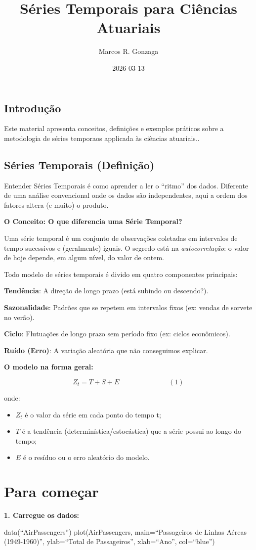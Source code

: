 \documentclass[
]{article}
\title{Séries Temporais para Ciências Atuariais}
\author{Marcos R. Gonzaga}
\date{2026-03-13}
\begin{document}
\maketitle

\subsection{Introdução}\label{introduuxe7uxe3o}

Este material apresenta conceitos, definições e exemplos práticos sobre
a metodologia de séries temporaos applicada às ciências atuariais..

\subsection{Séries Temporais
(Definição)}\label{suxe9ries-temporais-definiuxe7uxe3o}

Entender Séries Temporais é como aprender a ler o ``ritmo'' dos dados.
Diferente de uma análise convencional onde os dados são independentes,
aqui a ordem dos fatores altera (e muito) o produto.

\textbf{O Conceito: O que diferencia uma Série Temporal?}

Uma série temporal é um conjunto de observações coletadas em intervalos
de tempo sucessivos e (geralmente) iguais. O segredo está na
\emph{autocorrelação}: o valor de hoje depende, em algum nível, do valor
de ontem.

Todo modelo de séries temporais é divido em quatro componentes
principais:

\textbf{Tendência}: A direção de longo prazo (está subindo ou
descendo?).

\textbf{Sazonalidade}: Padrões que se repetem em intervalos fixos (ex:
vendas de sorvete no verão).

\textbf{Ciclo}: Flutuações de longo prazo sem período fixo (ex: ciclos
econômicos).

\textbf{Ruído (Erro)}: A variação aleatória que não conseguimos
explicar.

\textbf{O modelo na forma geral:}

\[Z_t=T+S+E\hspace{3cm}(1)\]

onde:

\begin{itemize}
\item
  \(Z_t\) é o valor da série em cada ponto do tempo t;
\item
  \(T\) é a tendência (determinística/estocástica) que a série possui ao
  longo do tempo;
\item
  \(E\) é o resíduo ou o erro aleatório do modelo.
\end{itemize}

\section{Para começar}\label{para-comeuxe7ar}

\textbf{1. Carregue os dados:}

data(``AirPassengers'') plot(AirPassengers, main=``Passageiros de Linhas
Aéreas (1949-1960)'', ylab=``Total de Passageiros'', xlab=``Ano'',
col=``blue'')
\end{document}
